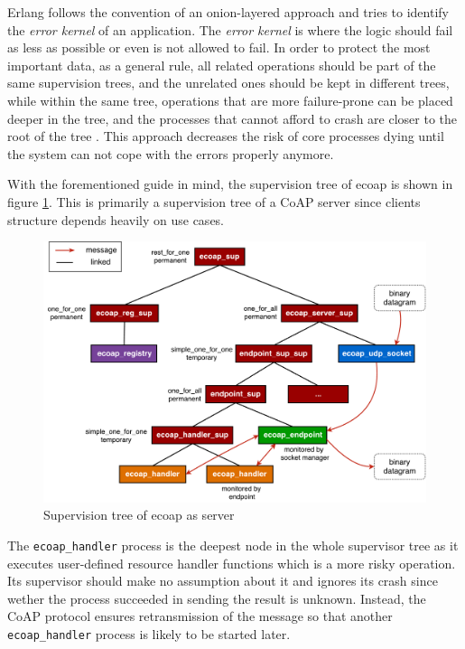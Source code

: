 Erlang follows the convention of an onion-layered approach and tries to identify the \textit{error kernel} of an application. The \textit{error kernel} is where the logic should fail as less as possible or even is not allowed to fail. In order to protect the most important data, as a general rule, all related operations should be part of the same supervision trees, and the unrelated ones should be kept in different trees, while within the same tree, operations that are more failure-prone can be placed deeper in the tree, and the processes that cannot afford to crash are closer to the root of the tree \cite{learn_you_some_erlang}. This approach decreases the risk of core processes dying until the system can not cope with the errors properly anymore.

With the forementioned guide in mind, the supervision tree of ecoap is shown in figure \ref{fig:system_arch}. This is primarily a supervision tree of a CoAP server since clients structure depends heavily on use cases. 

\begin{figure}[!htbp]
\centering
\includegraphics[scale = 0.49]{system_arch_vertical}
\caption{Supervision tree of ecoap as server}
\label{fig:system_arch}
\end{figure}

The \verb|ecoap_handler| process is the deepest node in the whole supervisor tree as it executes user-defined resource handler functions which is a more risky operation. Its supervisor should make no assumption about it and ignores its crash since wether the process succeeded in sending the result is unknown. Instead, the CoAP protocol ensures retransmission of the message so that another \verb|ecoap_handler| process is likely to be started later. 

